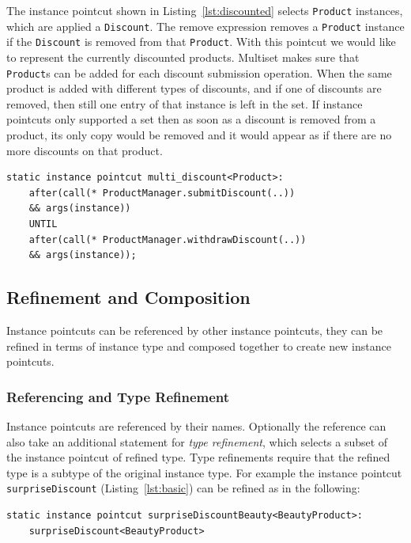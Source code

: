 \documentclass{acm_proc_article-sp}
\begin{document}
The instance pointcut shown in Listing~\ref{lst:discounted} selects \lstinline{Product} instances, which are applied a \texttt{Discount}. The remove expression removes a \lstinline{Product} instance if the \texttt{Discount} is removed from that \texttt{Product}. With this pointcut we would like to represent the currently discounted products. Multiset makes sure that \lstinline{Product}s can be added for each discount submission operation. When the same product is added with different types of discounts, and if one of discounts are removed, then still one entry of that instance is left in the set.  If instance pointcuts only supported a set then as soon as a discount is removed from a product, its only copy would be removed and it would appear as if there are no more discounts on that product. 

\begin{lstlisting}[float=h!, caption={An instance pointcut utilizing multiset property}, label={lst:discounted}]
static instance pointcut multi_discount<Product>: 
	after(call(* ProductManager.submitDiscount(..)) 
	&& args(instance)) 
	UNTIL 
	after(call(* ProductManager.withdrawDiscount(..)) 
	&& args(instance));
\end{lstlisting}


\subsection{Refinement and Composition}

Instance pointcuts can be referenced by other instance pointcuts, they can be refined in terms of instance type and composed together to create new instance pointcuts. 

\subsubsection{Referencing and Type Refinement}
Instance pointcuts are referenced by their names. Optionally the reference can also take an additional statement for \emph{type refinement}, which selects a subset of the instance pointcut of refined type. Type refinements require that the refined type is a subtype of the original instance type. For example the instance pointcut \lstinline{surpriseDiscount} (Listing~\ref{lst:basic}) can be refined as in the following:
\begin{lstlisting}[float=h!]
static instance pointcut surpriseDiscountBeauty<BeautyProduct>: 
	surpriseDiscount<BeautyProduct>
\end{lstlisting}
\end{document}
